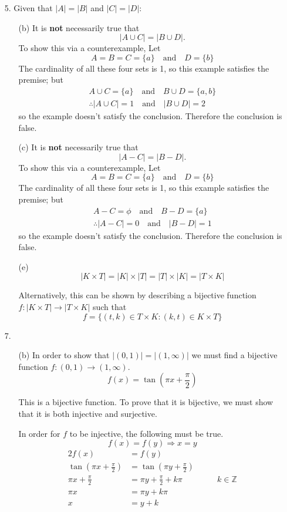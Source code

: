 \documentclass[fleqn]{article}
\begin{document}
\begin{enumerate}
	\item[5.]
	Given that \(|A| = |B|\) and \(|C| = |D|\):
	\begin{enumerate}
		\item[(b)]
		It is \textbf{not} necessarily true that
		\[|A \cup C| = |B \cup D|.\]
		To show this via a counterexample, Let
		\[A = B = C = \{a\} \quad \text{and} \quad D = \{b\}\]
		The cardinality of all these four sets is 1, so this example satisfies the premise; but
		\begin{gather*}
			A \cup C = \{a\} \quad \text{and} \quad B \cup D = \{a, b\} \\
			\therefore |A \cup C| = 1 \quad \text{and} \quad |B \cup D| = 2
		\end{gather*}
		so the example doesn't satisfy the conclusion. Therefore the conclusion is false.

		\item[(c)]
		It is \textbf{not} necessarily true that
		\[|A - C| = |B - D|.\]
		To show this via a counterexample, Let
		\[A = B = C = \{a\} \quad \text{and} \quad D = \{b\}\]
		The cardinality of all these four sets is 1, so this example satisfies the premise; but
		\begin{gather*}
			A - C = \phi \quad \text{and} \quad B - D = \{a\} \\
			\therefore |A - C| = 0 \quad \text{and} \quad |B - D| = 1
		\end{gather*}
		so the example doesn't satisfy the conclusion. Therefore the conclusion is false.

		\item[(e)]
		\[|K \times T| = |K| \times |T| = |T| \times |K| = |T \times K|\]

		Alternatively, this can be shown by describing a bijective function \(f : |K \times T| \to |T \times K|\) such that
		\[f = \{(t, k) \in T \times K : (k, t) \in K \times T\}\]
	\end{enumerate}

	\item[7.]
	\begin{enumerate}
		\item[(b)]
		In order to show that \(|(0, 1)| = |(1, \infty)|\) we must find a bijective function \(f : (0, 1) \to (1, \infty)\).
		\[f(x) = \tan\left(\pi x + \frac{\pi}{2}\right)\]
		
		This is a bijective function. To prove that it is bijective, we must show that it is both injective and surjective.

		In order for \(f\) to be injective, the following must be true.
		\[f(x) = f(y) \Rightarrow x = y\]
		\begin{alignat*}{2}
			f(x) &= f(y) \\
			\tan\left(\pi x + \frac{\pi}{2}\right) &= \tan\left(\pi y + \frac{\pi}{2}\right) \\
			\pi x + \frac{\pi}{2} &= \pi y + \frac{\pi}{2} + k \pi & \quad \quad k \in \mathbb{Z} \\
			\pi x &= \pi y + k \pi \\
			x &= y + k
		\end{alignat*}
		

\end{enumerate}
\end{enumerate}
\end{document}
